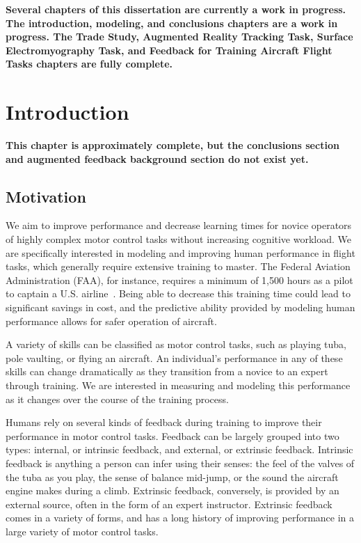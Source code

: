 \textbf{\color{red} Several chapters of this dissertation are currently a work in progress.
    The introduction, modeling, and conclusions chapters are a work in progress.
    The Trade Study, Augmented Reality Tracking Task, Surface Electromyography Task, and Feedback for Training Aircraft Flight Tasks chapters are fully complete.}

\chapter{Introduction}

\textbf{\color{red} This chapter is approximately complete, but the conclusions section and augmented feedback background section do not exist yet.}

\section{Motivation}
\label{sec:intro_overview}
We aim to improve performance and decrease learning times for novice operators of highly complex motor control tasks without increasing cognitive workload.
We are specifically interested in modeling and improving human performance in flight tasks, which generally require extensive training to master.
The Federal Aviation Administration (FAA), for instance, requires a minimum of 1,500 hours as a pilot to captain a U.S. airline~\citep{FAA}.
Being able to decrease this training time could lead to significant savings in cost, and the predictive ability provided by modeling human performance allows for safer operation of aircraft.

A variety of skills can be classified as motor control tasks, such as playing tuba, pole vaulting, or flying an aircraft.
An individual's performance in any of these skills can change dramatically as they transition from a novice to an expert through training.
We are interested in measuring and modeling this performance as it changes over the course of the training process.

Humans rely on several kinds of feedback during training to improve their performance in motor control tasks.
Feedback can be largely grouped into two types: internal, or intrinsic feedback, and external, or extrinsic feedback.
Intrinsic feedback is anything a person can infer using their senses: the feel of the valves of the tuba as you play, the sense of balance mid-jump, or the sound the aircraft engine makes during a climb.
Extrinsic feedback, conversely, is provided by an external source, often in the form of an expert instructor.
Extrinsic feedback comes in a variety of forms, and has a long history of improving performance in a large variety of motor control tasks.

